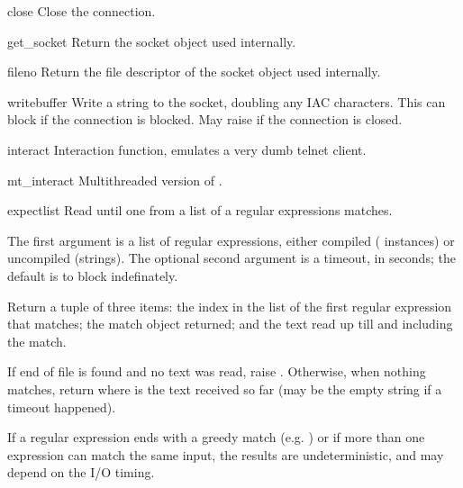 \begin{methoddesc}{close}{}
Close the connection.
\end{methoddesc}

\begin{methoddesc}{get_socket}{}
Return the socket object used internally.
\end{methoddesc}

\begin{methoddesc}{fileno}{}
Return the file descriptor of the socket object used internally.
\end{methoddesc}

\begin{methoddesc}{write}{buffer}
Write a string to the socket, doubling any IAC characters.
This can block if the connection is blocked.  May raise
 if the connection is closed.
\end{methoddesc}

\begin{methoddesc}{interact}{}
Interaction function, emulates a very dumb telnet client.
\end{methoddesc}

\begin{methoddesc}{mt_interact}{}
Multithreaded version of .
\end{methoddesc}

\begin{methoddesc}{expect}{list}
Read until one from a list of a regular expressions matches.

The first argument is a list of regular expressions, either
compiled ( instances) or uncompiled (strings).
The optional second argument is a timeout, in seconds; the default
is to block indefinately.

Return a tuple of three items: the index in the list of the
first regular expression that matches; the match object
returned; and the text read up till and including the match.

If end of file is found and no text was read, raise
.  Otherwise, when nothing matches, return
 where  is the text received so
far (may be the empty string if a timeout happened).

If a regular expression ends with a greedy match (e.g. )
or if more than one expression can match the same input, the
results are undeterministic, and may depend on the I/O timing.
\end{methoddesc}


